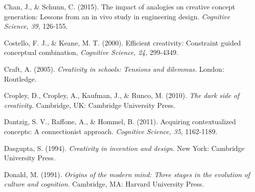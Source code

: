 \documentclass[a4paper,12pt,man,british]{apa6}
\begin{document}
\begin{description}

\item Chan, J., \& Schunn, C. (2015). The impact of analogies on creative concept generation: Lessons from an in vivo study in engineering design. \emph{Cognitive Science, 39,} 126-155.


\item Costello, F. J., \& Keane, M. T. (2000). Efficient creativity: Constraint guided conceptual combination, \emph{Cognitive Science, 24,} 299-4349.

\item Craft, A. (2005). \emph{Creativity in schools: Tensions and dilemmas.} London: Routledge.

\item Cropley, D., Cropley, A., Kaufman, J., \& Runco, M. (2010). \emph{The dark side of creativity.} Cambridge, UK: Cambridge University Press.



\item Dantzig, S. V., Raffone, A., \& Hommel, B. (2011). Acquiring contextualized concepts: A connectionist approach. \emph{Cognitive Science, 35,} 1162-1189.

\item Dasgupta, S. (1994). \emph{Creativity in invention and design.} New York: Cambridge University Press.

\item Donald, M. (1991). \emph{Origins of the modern mind: Three stages in the evolution of culture and cognition.} Cambridge, MA: Harvard University Press.


\end{description}
\end{document}
